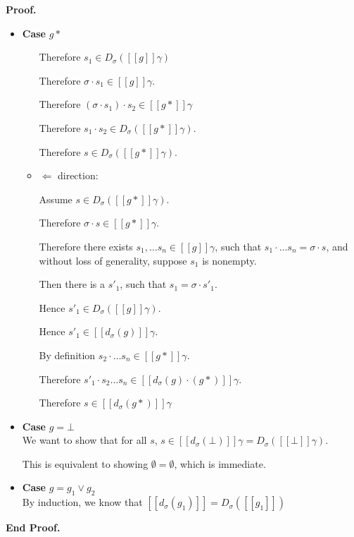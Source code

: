 \documentclass{article}
\newcommand{\interp}[1]{[\![{#1}]\!]}
\newcommand{\semderiv}[2]{D_{#1}({#2})}
\newcommand{\deriv}[2]{d_{#1}({#2})}
\newenvironment{proof}{\noindent\textbf{Proof.}}{\noindent\textbf{End Proof.}}
\newenvironment{caseblock}{\begin{itemize}}{\end{itemize}}
\newenvironment{case}[1]{\item \textbf{Case} {#1}\\}{}
\begin{document}
\begin{proof}
\begin{caseblock}
\begin{case}{$g*$}
\begin{itemize}
          Therefore $s_1 \in \semderiv{\sigma}{\interp{g}\gamma}$
          
          Therefore $\sigma\cdot s_1 \in \interp{g}{\gamma}$. 
          
          Therefore $(\sigma\cdot s_1)\cdot s_2 \in \interp{g*}\gamma$
          
          Therefore $s_1\cdot s_2 \in \semderiv{\sigma}{\interp{g*}\gamma}$. 
          
          Therefore $s \in \semderiv{\sigma}{\interp{g*}\gamma}$. 

        \item $\Leftarrow$ direction: 

          Assume $s \in \semderiv{\sigma}{\interp{g*}\gamma}$. 

          Therefore $\sigma\cdot s \in \interp{g*}\gamma$. 

          Therefore there exists $s_1, \ldots s_n \in \interp{g}\gamma$, such that $s_1\cdot\ldots s_n = \sigma\cdot s$, and without loss of generality, suppose $s_1$ is nonempty.  

          Then there is a $s'_1$, such that $s_1 = \sigma\cdot s'_1$. 

          Hence $s'_1 \in \semderiv{\sigma}{\interp{g}\gamma}$.

          Hence $s'_1 \in \interp{\deriv{\sigma}{g}}\gamma$. 

          By definition $s_2\cdot\ldots s_n \in \interp{g*}\gamma$. 

          Therefore $s'_1\cdot s_2\ldots s_n \in \interp{\deriv{\sigma}{g}\cdot(g*)}\gamma$. 
          
          Therefore $s \in \interp{\deriv{\sigma}{g*}}\gamma$
      \end{itemize}
    \end{case}

    \begin{case}{$g = \bot$}
      We want to show that for all $s$, $s \in \interp{\deriv{\sigma}{\bot}}\gamma = \semderiv{\sigma}{\interp{\bot}\gamma}$. 
      
      This is equivalent to showing $\emptyset = \emptyset$, which is immediate. 
    \end{case}

    \begin{case}{$g = g_1 \vee g_2$}

      By induction, we know that $\interp{\deriv{\sigma}{g_1}} = \semderiv{\sigma}{\interp{g_1}}$


\end{case}
\end{caseblock}
\end{proof}
\end{document}
